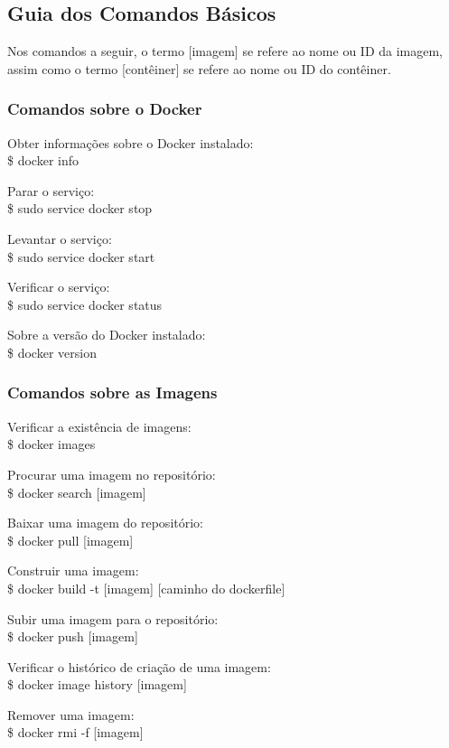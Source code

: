 \documentclass[a4paper,11pt]{article}
\begin{document}
\subsection{Guia dos Comandos Básicos}
Nos comandos a seguir, o termo [imagem] se refere ao nome ou ID da imagem, assim como o termo [contêiner] se refere ao nome ou ID do contêiner.

\subsubsection{Comandos sobre o Docker}
Obter informações sobre o Docker instalado: \\
{\ttfamily\$ docker info}

Parar o serviço: \\
{\ttfamily\$ sudo service docker stop}

Levantar o serviço: \\
{\ttfamily\$ sudo service docker start}

Verificar o serviço: \\
{\ttfamily\$ sudo service docker status}

Sobre a versão do Docker instalado: \\
{\ttfamily\$ docker version}

\subsubsection{Comandos sobre as Imagens}
Verificar a existência de imagens: \\
{\ttfamily\$ docker images}

Procurar uma imagem no repositório: \\
{\ttfamily\$ docker search [imagem]}

Baixar uma imagem do repositório: \\
{\ttfamily\$ docker pull [imagem]}

Construir uma imagem: \\
{\ttfamily\$ docker build -t [imagem] [caminho do dockerfile]}

Subir uma imagem para o repositório: \\
{\ttfamily\$ docker push [imagem]}

Verificar o histórico de criação de uma imagem: \\
{\ttfamily\$ docker image history [imagem]}

Remover uma imagem: \\
{\ttfamily\$ docker rmi -f [imagem]}
\end{document}
